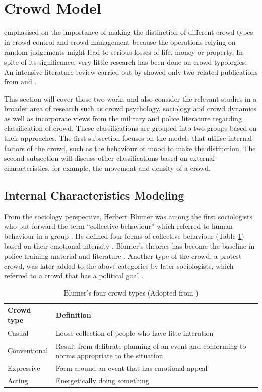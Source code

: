 \section{Crowd Model}
\citet{Berlonghi1995} emphasised on the importance of making the distinction of different crowd types in crowd control and crowd management because the operations relying on random judgements might lead to serious losses of life, money or property. In spite of its significance, very little research has been done on crowd typologies. An intensive literature review carried out by \citet{Challenger2009} showed only two related publications from \citet{Momboisse1967} and \citet{Berlonghi1995}.

This section will cover those two works and also consider the relevant studies in a broader area of research such as crowd psychology, sociology and crowd dynamics as well as incorporate views from the military and police literature regarding classification of crowd. These classifications are grouped into two groups based on their approaches. The first subsection focuses on the models that utilise internal factors of the crowd, such as the behaviour or mood to make the distinction. The second subsection will discuss other classifications based on external characteristics, for example, the movement and density of a crowd.

\subsection{Internal Characteristics Modeling}

From the sociology perspective, Herbert Blumer was among the first sociologists who put forward the term ``collective behaviour'' which referred to human behaviour in a group \citep{Blumer1951}. He defined four forms of collective behaviour (Table \ref{table:blumerCrowdType}) based on their emotional intensity \citep{Imhonopi2013}. Blumer’s theories has become the baseline in police training material and literature \citep{Schweingruber2000}. Another type of the crowd, a protest crowd, was later added to the above categories by later sociologists, which referred to a crowd that has a political goal \citep{Imhonopi2013}.

\begin{table}[!htbp]
	\caption{Blumer's four crowd types (Adopted from \citet{Imhonopi2013})}
	\label{table:blumerCrowdType}
	\centering
	\begin{tabular}{|l|p{10cm}|}
		\hline
		\textbf{Crowd type} & \textbf{Definition} \\ \hline \hline
		Casual & Loose collection of people who have litte interation \\ \hline
		Conventional & Result from delibrate planning of an event and conforming to norms appropriate to the situation \\ \hline
		Expressive & Form around an event that has emotional appeal \\ \hline
		Acting & Energetically doing something \\ \hline
	\end{tabular}
\end{table}

